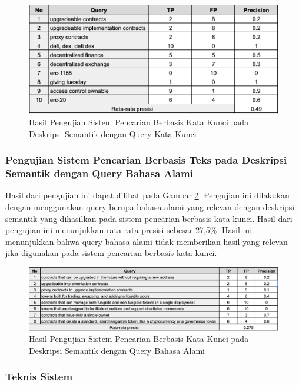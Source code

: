 \begin{figure}[ht]
	\centering
	\includegraphics[width=1\textwidth]{resources/chapter-4/data-1-5.png}
	\caption{Hasil Pengujian Sistem Pencarian Berbasis Kata Kunci pada Deskripsi Semantik dengan Query Kata Kunci}
	\label{image:pengujian-5}
\end{figure}

\subsubsection{Pengujian Sistem Pencarian Berbasis Teks pada Deskripsi Semantik dengan Query Bahasa Alami}

Hasil dari pengujian ini dapat dilihat pada Gambar \ref{image:pengujian-6}. Pengujian ini dilakukan dengan menggunakan query berupa bahasa alami yang relevan dengan deskripsi semantik yang dihasilkan pada sistem pencarian berbasis kata kunci. Hasil dari pengujian ini menunjukkan rata-rata presisi sebesar 27,5\%. Hasil ini menunjukkan bahwa query bahasa alami tidak memberikan hasil yang relevan jika digunakan pada sistem pencarian berbasis kata kunci.

\begin{figure}[ht]
	\centering
	\includegraphics[width=1\textwidth]{resources/chapter-4/data-1-6.png}
	\caption{Hasil Pengujian Sistem Pencarian Berbasis Kata Kunci pada Deskripsi Semantik dengan Query Bahasa Alami}
	\label{image:pengujian-6}
\end{figure}

\subsubsection{Teknis Sistem}
\label{subsec:teknis-sistem}

